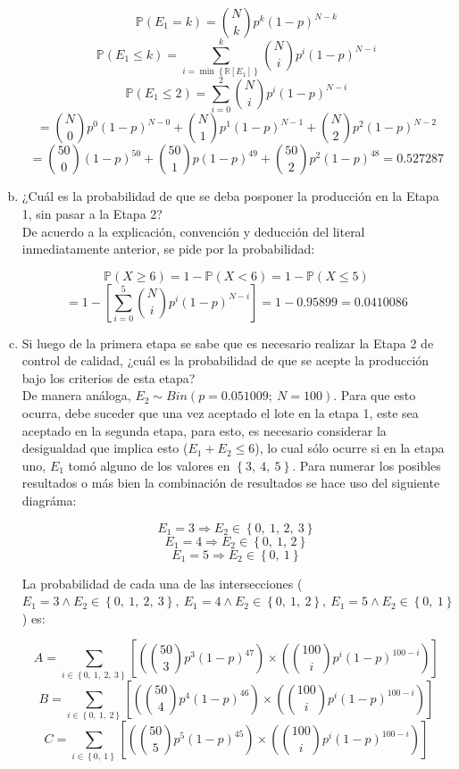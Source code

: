 \documentclass[11pt, spanish]{article}
\begin{document}
\begin{enumerate}[(a)]
$$\mathbb{P}(E_1 = k) = \binom{N}{k}p^k(1-p)^{N-k}$$
$$\mathbb{P}(E_1 \leq k) = \sum_{i = \min{\left\{\mathbb{R}[E_1]\right\}}}^{k}  \binom{N}{i}p^i(1-p)^{N-i}$$
$$\mathbb{P}(E_1 \leq 2) = \sum_{i = 0}^{2}  \binom{N}{i}p^i(1-p)^{N-i} $$
$$= \binom{N}{0}p^0(1-p)^{N-0} + \binom{N}{1}p^1(1-p)^{N-1} + \binom{N}{2}p^2(1-p)^{N-2}$$
$$= \binom{50}{0}(1-p)^{50} + \binom{50}{1}p(1-p)^{49} + \binom{50}{2}p^2(1-p)^{48} = 0.527287$$
 
\item ¿Cuál es la probabilidad de que se deba posponer la producción en la Etapa 1, sin
pasar a la Etapa 2?\\

De acuerdo a la explicación, convención y deducción del literal inmediatamente anterior, se pide por la probabilidad:

$$\mathbb{P}(X \geq 6) = 1 - \mathbb{P}(X < 6) = 1 - \mathbb{P}(X \leq 5)$$
$$= 1 - \left[ \sum_{i = 0}^{5}  \binom{N}{i}p^i(1-p)^{N-i} \right] = 1 - 0.95899 = 0.0410086$$

\item Si luego de la primera etapa se sabe que es necesario realizar la Etapa 2 de
control de calidad, ¿cuál es la probabilidad de que se acepte la producción bajo los criterios de
esta etapa?\\

De manera análoga, $E_2 \sim Bin(p = 0.051009;\ N = 100)$. Para que esto ocurra, debe suceder que una vez aceptado el lote en la etapa 1, este sea aceptado en la segunda etapa, para esto, es necesario considerar la desigualdad que implica esto ($E_1 + E_2 \leq 6$), lo cual sólo ocurre si en la etapa uno, $E_1$ tomó alguno de los valores en $\left\{ 3,\ 4,\ 5 \right\}$. Para numerar los posibles resultados o más bien la combinación de resultados se hace uso del siguiente diagráma:

$$E_1 = 3 \Rightarrow E_2 \in \left\{ 0,\ 1,\, 2,\ 3\right\}$$
$$E_1 = 4 \Rightarrow E_2 \in \left\{ 0,\ 1,\, 2\right\}$$
$$E_1 = 5 \Rightarrow E_2 \in \left\{ 0,\ 1\right\}$$

La probabilidad de cada una de las intersecciones ($E_1 = 3 \wedge E_2 \in \left\{ 0,\ 1,\ 2,\ 3 \right\},\ E_1 = 4 \wedge E_2 \in \left\{ 0,\ 1,\ 2\right\},\ E_1 = 5 \wedge E_2 \in \left\{ 0,\ 1\right\}$) es:

$$A = \sum_{i \in \left\{ 0,\ 1,\ 2,\ 3 \right\}} \left[ \left( \binom{50}{3}p^3(1-p)^{47} \right) \times  \left( \binom{100}{i}p^i(1-p)^{100 - i} \right) \right]$$
$$B = \sum_{i \in \left\{ 0,\ 1,\ 2 \right\}} \left[ \left( \binom{50}{4}p^4(1-p)^{46} \right) \times  \left( \binom{100}{i}p^i(1-p)^{100 - i} \right) \right]$$
$$C = \sum_{i \in \left\{ 0,\ 1 \right\}} \left[ \left( \binom{50}{5}p^5(1-p)^{45} \right) \times  \left( \binom{100}{i}p^i(1-p)^{100 - i} \right) \right]$$


\end{enumerate}
\end{document}
